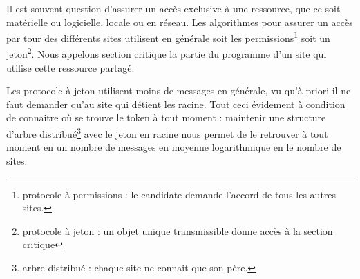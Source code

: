 Il est souvent question d'assurer un accès exclusive à une ressource, que ce soit matérielle ou logicielle, locale ou en réseau. Les algorithmes pour assurer un accès par tour des différents sites utilisent en générale soit les permissions\footnote{protocole à permissions : le candidate demande l'accord de tous les autres sites.} soit un jeton\footnote{protocole à jeton : un objet unique transmissible donne accès à la section critique}. Nous appelons \og section critique \fg{} la partie du programme d'un site qui utilise cette ressource partagé.

Les protocole à jeton utilisent moins de messages en générale, vu qu'à priori il ne faut demander qu'au site qui détient les racine. Tout ceci évidement à condition de connaitre où se trouve le token à tout moment : maintenir une structure d'arbre distribué\footnote{arbre distribué : chaque site ne connait que son père.} avec le jeton en racine nous permet de le retrouver à tout moment en un nombre de messages en moyenne logarithmique en le nombre de sites.